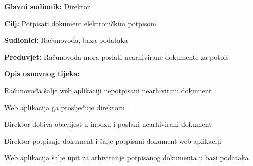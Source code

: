			
				\noindent {}
				\begin{packed_item}
					
					\item \textbf{Glavni sudionik:} Direktor
					\item  \textbf{Cilj:} Potpisati dokument elektroničkim potpisom
					\item  \textbf{Sudionici:} Računovođa, baza podataka
					\item  \textbf{Preduvjet:} Računovođa mora poslati nearhivirane dokumente za potpis
					\item  \textbf{Opis osnovnog tijeka:}
					
					\item[] \begin{packed_enum}
						
						\item Računovođa šalje web aplikaciji nepotpisani nearhivirani dokument
						\item Web aplikacija ga prosljeđuje direktoru
						\item Direktor dobiva obavijest u inboxu i poslani nearhivirani dokument
						\item Direktor potpisuje dokument i šalje potpisani dokument web aplikaciji
						\item Web aplikacija šalje upit za arhiviranje potpisanog dokumenta u bazi podataka 
						
					\end{packed_enum}
					
				\end{packed_item}
			
